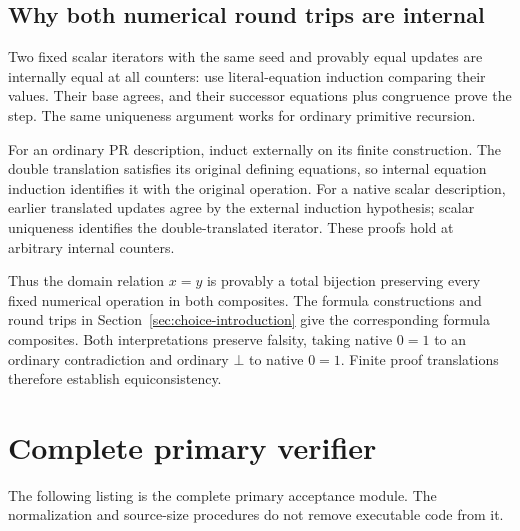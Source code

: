 \documentclass[11pt,letterpaper]{article}
\theoremstyle{definition}
\begin{document}
\subsection{Why both numerical round trips are internal}

Two fixed scalar iterators with the same seed and provably equal
updates are internally equal at all counters: use literal-equation
induction comparing their values. Their base agrees, and their
successor equations plus congruence prove the step. The same
uniqueness argument works for ordinary primitive recursion.

For an ordinary PR description, induct externally on its finite
construction. The double translation satisfies its original
defining equations, so internal equation induction identifies it
with the original operation. For a native scalar description,
earlier translated updates agree by the external induction
hypothesis; scalar uniqueness identifies the double-translated
iterator. These proofs hold at arbitrary internal counters.

Thus the domain relation $x=y$ is provably a total bijection
preserving every fixed numerical operation in both composites.
The formula constructions and round trips in
Section~\ref{sec:choice-introduction} give the corresponding formula
composites. Both interpretations preserve falsity, taking native
$0=1$ to an ordinary contradiction and ordinary $\bot$ to native
$0=1$. Finite proof translations therefore establish equiconsistency.
\clearpage
\section{Complete primary verifier}

The following listing is the complete primary acceptance module.
The normalization and source-size procedures do not remove executable
code from it.
\end{document}
